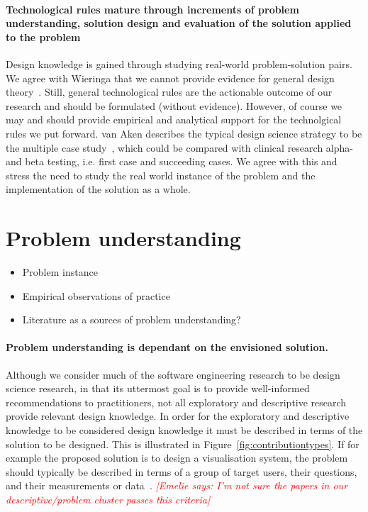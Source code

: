 \documentclass[graybox]{svmult}
\newcommand{\emelie}[1]{\textcolor{red}{{\it [Emelie says: #1]}}}
\newcommand{\emelie}[1]{}
\begin{document}
\paragraph{Technological rules mature through increments of problem understanding, solution design and evaluation of the solution applied to the problem} 

Design knowledge is gained through studying real-world problem-solution pairs. We agree with Wieringa that we cannot provide evidence for general design theory~\cite{wieringa_six_2015}. Still, general technological rules are the actionable outcome of our research and should be formulated (without evidence). However, of course we may and should provide empirical and analytical support for the technolgical rules we put forward. van Aken describes the typical design science strategy to be the multiple case study~\cite{van_aken_management_2004}, which could be compared with clinical research alpha- and beta testing, i.e. first case and succeeding cases. We agree with this and stress the need to study the real world instance of the problem and the implementation of the solution as a whole.

\section{Problem understanding}
\begin{itemize}
\item Problem instance
\item Empirical observations of practice
\item Literature as a sources of problem understanding?
\end{itemize}

\paragraph{Problem understanding is dependant on the envisioned solution.}Although we consider much of the software engineering research to be design science research, in that its uttermost goal is to provide well-informed recommendations to practitioners, not all exploratory and descriptive research provide relevant design knowledge. In order for the exploratory and descriptive knowledge to be considered design knowledge it must be described in terms of the solution to be designed. This is illustrated in Figure~\ref{fig:contributiontypes}. If for example the proposed solution is to design a visualisation system, the problem should typically be described in terms of a group of target users, their questions, and their measurements or data~\cite{meyer_nested_2015}. \emelie{I'm not sure the papers in our descriptive/problem cluster passes this criteria}
\end{document}
